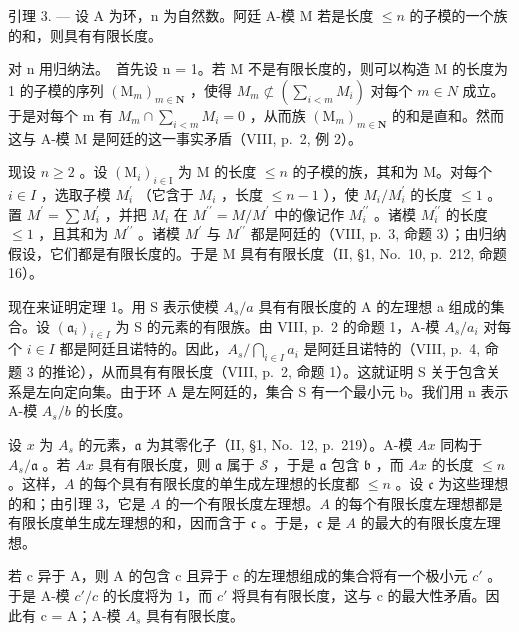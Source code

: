 引理 3. --- 设 A 为环，n 为自然数。阿廷 A-模 M 若是长度 \(\leqslant n\) 的子模的一个族的和，则具有有限长度。

对 n 用归纳法。~首先设 n = 1。若 M 不是有限长度的，则可以构造 M 的长度为 1 的子模的序列 \((\mathrm{M}_{m})_{m \in \mathbf{N}}\) ，使得 \(M_{m} \not\subset (\sum_{i < m} M_{i})\) 对每个 \(m \in N\) 成立。于是对每个 m 有 \(M_{m} \cap \sum_{i < m} M_{i} = 0\) ，从而族 \((\mathrm{M}_{m})_{m \in \mathbf{N}}\) 的和是直和。然而这与 A-模 M 是阿廷的这一事实矛盾（VIII, p.~2, 例 2）。

现设 \(n \geqslant 2\) 。设 \((\mathrm{M}_{i})_{i \in \mathrm{I}}\) 为 M 的长度 \(\leqslant n\) 的子模的族，其和为 M。对每个 \(i \in I\) ，选取子模 \(M_{i}^{\prime}\) （它含于 \(M_{i}\) ，长度 \(\leqslant n - 1\) ），使 \(M_{i}/M_{i}^{\prime}\) 的长度 \(\leqslant 1\) 。置 \(M^{\prime} = \sum M_{i}^{\prime}\) ，并把 \(M_{i}\) 在 \(M^{\prime\prime} = M/M^{\prime}\) 中的像记作 \(M_{i}^{\prime\prime}\) 。诸模 \(M_{i}^{\prime\prime}\) 的长度 \(\leqslant 1\) ，且其和为 \(M^{\prime\prime}\) 。诸模 \(M^{\prime}\) 与 \(M^{\prime\prime}\) 都是阿廷的（VIII, p.~3, 命题 3）；由归纳假设，它们都是有限长度的。于是 M 具有有限长度（II, §1, No.~10, p.~212, 命题 16）。

现在来证明定理 1。用 S 表示使模 \(A_{s}/a\) 具有有限长度的 A 的左理想 a 组成的集合。设 \((\mathfrak{a}_{i})_{i\in I}\) 为 S 的元素的有限族。由 VIII, p.~2 的命题 1，A-模 \(A_{s}/a_{i}\) 对每个 \(i\in I\) 都是阿廷且诺特的。因此，\(A_{s}/\bigcap_{i\in I}a_{i}\) 是阿廷且诺特的（VIII, p.~4, 命题 3 的推论），从而具有有限长度（VIII, p.~2, 命题 1）。这就证明 S 关于包含关系是左向定向集。由于环 A 是左阿廷的，集合 S 有一个最小元 b。我们用 n 表示 A-模 \(A_{s}/b\) 的长度。

设 \(x\) 为 \(A_s\) 的元素，\(\mathfrak{a}\) 为其零化子（II, §1, No.~12, p.~219）。A-模 \(Ax\) 同构于 \(A_s / \mathfrak{a}\) 。若 \(Ax\) 具有有限长度，则 \(\mathfrak{a}\) 属于 \(\mathscr{S}\) ，于是 \(\mathfrak{a}\) 包含 \(\mathfrak{b}\) ，而 \(Ax\) 的长度 \(\leqslant n\) 。这样，\(A\) 的每个具有有限长度的单生成左理想的长度都 \(\leqslant n\) 。设 \(\mathfrak{c}\) 为这些理想的和；由引理 3，它是 \(A\) 的一个有限长度左理想。\(A\) 的每个有限长度左理想都是有限长度单生成左理想的和，因而含于 \(\mathfrak{c}\) 。于是，\(\mathfrak{c}\) 是 \(A\) 的最大的有限长度左理想。

若 c 异于 A，则 A 的包含 c 且异于 c 的左理想组成的集合将有一个极小元 \(c'\) 。于是 A-模 \(c'/c\) 的长度将为 1，而 \(c'\) 将具有有限长度，这与 c 的最大性矛盾。因此有 c = A；A-模 \(A_{s}\) 具有有限长度。

